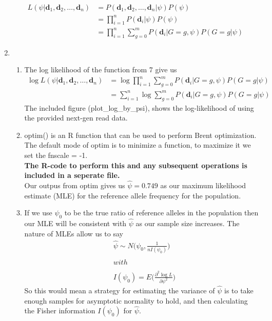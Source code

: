 \documentclass[12pt]{article}
\numberwithin{theorem}{subsection}
\theoremstyle{definition}
\numberwithin{definition}{subsection}
\numberwithin{corollary}{subsection}
\theoremstyle{remark}
\begin{document}
\begin{enumerate}[label=\textbf{\arabic*.}, start=6]
\begin{align*}
            L(\psi | \bm{d}_1, \bm{d}_2, \dots, \bm{d}_n ) &= P(\bm{d}_1, \bm{d}_2, \dots, \bm{d}_n | \psi)P(\psi)\\
                &=\prod_{i = 1}^nP(\bm{d}_i | \psi)P(\psi)\\
                &=\prod_{i = 1}^n\sum_{g = 0}^m P(\bm{d}_i | G = g, \psi)P(G = g | \psi)
        \end{align*}
    \item 
        \begin{enumerate}[label = \textbf{\alph*.}]
            \item The log likelihood of the function from 7 give us
                \begin{align*}
                \log{L(\psi | \bm{d}_1, \bm{d}_2, \dots, \bm{d}_n )} &= \log \prod_{i = 1}^n\sum_{g = 0}^m P(\bm{d}_i | G = g, \psi)P(G = g | \psi)\nonumber\\
                    &= \sum_{i = 1}^n\log \sum_{g = 0}^m P(\bm{d}_i | G = g, \psi)P(G = g | \psi) \label{loglikpre}
                \end{align*}
            The included figure (plot\_log\_by\_psi), shows the log-likelihood of using the provided next-gen read data.
            \item optim() is an R function that can be used to perform Brent optimization. The default mode of optim is to minimize a function, to maximize it we set the fnscale = -1.\\ 
            \textbf{The R-code to perform this and any subsequent operations is included in a seperate file.}\\
            Our outpus from optim gives us $\hat{\psi} = 0.749$ as our maximum likelihood estimate (MLE) for the reference allele frequency for the population.
            \item If we use $\psi_0$ to be the true ratio of reference alleles in the population then our MLE will be consistent with $\hat{\psi}$ as our sample size increases. The nature of MLEs allow us to say 
                \begin{align*}
                    &\hat{\psi} \sim N\Big(\psi_0, \frac{1}{nI(\psi_0)}\Big)\\\\
                    &with\\\\
                    &I(\psi_0) = E\Big(\frac{\partial^2 \log{L}}{\partial\psi^2}\Big)
                \end{align*}
            So this would mean a strategy for estimating the variance of $\hat{\psi}$ is to take enough samples for asymptotic normality to hold, and then calculating the Fisher information $I(\psi_0)$ for $\hat{\psi}$.

\end{enumerate}
\end{enumerate}
\end{document}
